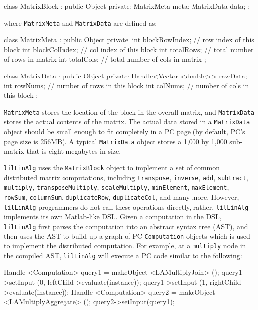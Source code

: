 \begin{code}
class MatrixBlock : public Object {
private:
    MatrixMeta meta;
    MatrixData data;
};
\end{code}

\noindent where \texttt{MatrixMeta} and \texttt{MatrixData} are defined as:

\begin{code}
class MatrixMeta : public Object {
private:
    int blockRowIndex; // row index of this block
    int blockColIndex; // col index of this block
    int totalRows; // total number of rows in matrix 
    int totalCols; // total number of cols in matrix
};

class MatrixData : public Object {
private:
    Handle<Vector <double>> rawData;
    int rowNums; // number of rows in this block
    int colNums; // number of cols in this block
};
\end{code}

\noindent \texttt{MatrixMeta} stores the location of the block in the overall matrix, and
\texttt{MatrixData} stores the actual contents of the matrix.
The actual data stored in a \texttt{MatrixData} object should be small enough to fit completely in 
a PC page (by default, PC's page size is 256MB).  A typical \texttt{MatrixData} object stores a
1,000 by 1,000 sub-matrix that is eight megabytes in size.

\texttt{lilLinAlg} uses the \texttt{MatrixBlock} object to implement a set of common distributed matrix
computations, including \texttt{transpose},
\texttt{inverse}, \texttt{add}, \texttt{subtract}, \texttt{multiply}, \texttt{transposeMultiply}, 
\texttt{scaleMultiply}, \texttt{minElement},
\texttt{maxElement}, \texttt{rowSum}, \texttt{columnSum}, \texttt{duplicateRow}, \texttt{duplicateCol}, 
and many more.  However, \texttt{lilLinAlg} programmers do not call these operations directly, rather,
\texttt{lilLinAlg} implements its own Matlab-like DSL.  
Given a computation in the DSL, \texttt{lilLinAlg} first parses the computation into an abstract syntax tree (AST), and then
uses the AST to build up a graph of PC \texttt{Computation} objects which is used to implement the distributed computation.
For example, at a \texttt{multiply} node in the compiled AST, \texttt{lilLinAlg} 
will execute a PC code similar to the following:

\begin{codesmall}
Handle <Computation> query1 = makeObject <LAMultiplyJoin> ();
query1->setInput (0, leftChild->evaluate(instance));
query1->setInput (1, rightChild->evaluate(instance));
Handle <Computation> query2 = makeObject <LAMultiplyAggregate> ();
query2->setInput(query1);
\end{codesmall}

